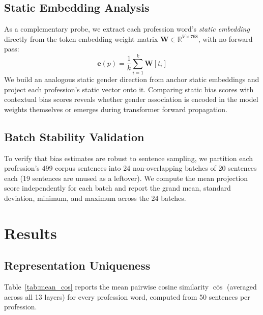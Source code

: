 \documentclass[11pt,a4paper]{article}
\begin{document}
\subsection{Static Embedding Analysis}

As a complementary probe, we extract each profession word's \emph{static
embedding} directly from the token embedding weight matrix
$\mathbf{W} \in \mathbb{R}^{V \times 768}$, with no forward pass:
\begin{equation}
  \mathbf{e}(p) = \frac{1}{k}\sum_{i=1}^{k} \mathbf{W}[t_i]
\end{equation}
We build an analogous static gender direction from anchor static embeddings and
project each profession's static vector onto it. Comparing static bias scores
with contextual bias scores reveals whether gender association is encoded in the
model weights themselves or emerges during transformer forward propagation.

\subsection{Batch Stability Validation}

To verify that bias estimates are robust to sentence sampling, we partition
each profession's 499 corpus sentences into 24 non-overlapping batches of 20
sentences each (19 sentences are unused as a leftover). We compute the mean
projection score independently for each batch and report the grand mean,
standard deviation, minimum, and maximum across the 24 batches.


\section{Results}

\subsection{Representation Uniqueness}

Table~\ref{tab:mean_cos} reports the mean pairwise cosine similarity
$\overline{\cos}$ (averaged across all 13 layers) for every profession word,
computed from 50 sentences per profession.
\end{document}
